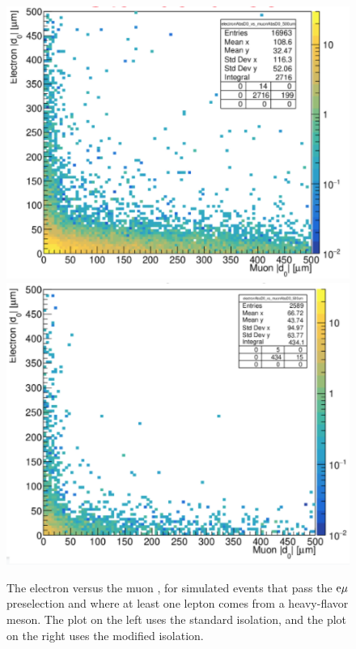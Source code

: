 \begin{figure}[hbtp]
\centering
\includegraphics[scale=0.4]{figures/selection/StandardIso_ElectronD0vsMuonD0_2018emuTTbar.png}
\includegraphics[scale=0.4]{figures/selection/CustomIso_ElectronD0vsMuonD0_2018emuTTbar.png}
\caption{The electron \ad versus the muon \ad, for \ttbar simulated events that pass the $\mathrm{e}{\mu}$ preselection and where at least one lepton comes from a heavy-flavor meson. The plot on the left uses the standard isolation, and the plot on the right uses the modified isolation.}
\label{iso_pu_performance_comparison}
\end{figure}

